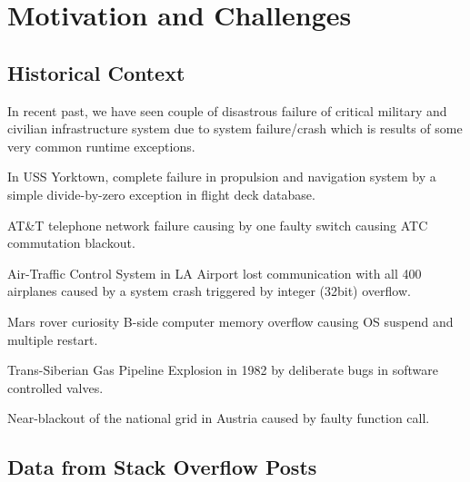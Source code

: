 

\section{Motivation and Challenges}
\label{sec:motivation}

\subsection{Historical Context}
\label{subsec:historicalContext}

In recent past, we have seen couple of disastrous failure of critical military
and civilian infrastructure system due to system failure/crash which is results
of some very common runtime exceptions.

\begin{mylist}
  
  \item In USS Yorktown, complete failure in propulsion and navigation system by
  a simple divide-by-zero exception in flight deck database.
  
  \item AT\&T telephone network failure causing by one faulty switch causing ATC
  commutation blackout.
  
  \item Air-Traffic Control System in LA Airport lost communication with all 400
  airplanes caused by a system crash triggered by integer (32bit) overflow.
  
  \item Mars rover curiosity B-side computer memory overflow causing OS suspend
  and multiple restart.
  
  \item Trans-Siberian Gas Pipeline Explosion in 1982 by deliberate bugs in
  software controlled valves.
  
  \item Near-blackout of the national grid in Austria caused by faulty function
  call.
  
  
\end{mylist}


\subsection{Data from Stack Overflow Posts}
\label{subsec:stackoverflow}

